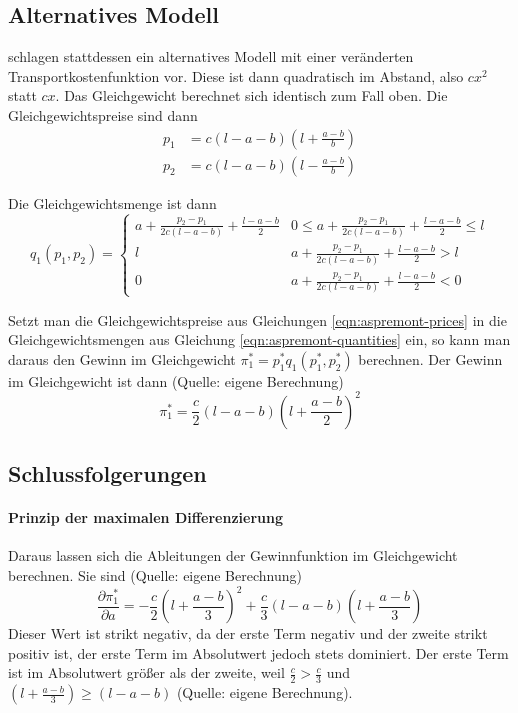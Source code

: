 \subsection{Alternatives Modell}\label{Sec-Aspremont-Modell}
\citet{aspremont1979} schlagen stattdessen ein alternatives Modell mit einer veränderten Transportkostenfunktion vor. Diese ist dann quadratisch im Abstand, also $cx^2$ statt $cx$.
Das Gleichgewicht berechnet sich identisch zum Fall oben. Die Gleichgewichtspreise sind dann
\begin{equation} \label{eqn:aspremont-prices}
\begin{split}
p_1 &= c (l-a-b) \left(l+\frac{a-b}{b}\right) \\
p_2 &= c (l-a-b) \left(l-\frac{a-b}{b}\right)
\end{split}
\end{equation}

Die Gleichgewichtsmenge ist dann \citep[S.\,1148]{aspremont1979}
\begin{equation} \label{eqn:aspremont-quantities}
q_1(p_1,p_2) = \begin{cases}
	a+ \frac{p_2-p_1}{2c(l-a-b)} + \frac{l-a-b}{2} & 0\leq a+ \frac{p_2-p_1}{2c(l-a-b)} + \frac{l-a-b}{2} \leq l\\
	l & a+ \frac{p_2-p_1}{2c(l-a-b)} + \frac{l-a-b}{2}>l\\
	0 & a+ \frac{p_2-p_1}{2c(l-a-b)} + \frac{l-a-b}{2}<0
\end{cases}
\end{equation}

Setzt man die Gleichgewichtspreise aus Gleichungen \ref{eqn:aspremont-prices} in die Gleichgewichtsmengen aus Gleichung \ref{eqn:aspremont-quantities} ein, so kann man daraus den Gewinn im Gleichgewicht $\pi_1^*=p_1^* q_1(p_1^*, p_2^*)$ berechnen.
Der Gewinn im Gleichgewicht ist dann (Quelle: eigene Berechnung)
\begin{equation}
\pi_1^* = \frac{c}{2} (l-a-b) \left(l+ \frac{a-b}{2} \right)^2
\end{equation}

\subsection{Schlussfolgerungen}

\paragraph{Prinzip der maximalen Differenzierung}
Daraus lassen sich die Ableitungen der Gewinnfunktion im Gleichgewicht berechnen. Sie sind (Quelle: eigene Berechnung)
\begin{equation}
\frac{\partial \pi_1^*}{\partial a} = -\frac{c}{2}\left(l+\frac{a-b}{3}\right)^2 + \frac{c}{3} (l-a-b) \left( l+\frac{a-b}{3} \right)
\end{equation}
Dieser Wert ist strikt negativ, da der erste Term negativ und der zweite strikt positiv ist, der erste Term im Absolutwert jedoch stets dominiert. Der erste Term ist im Absolutwert größer als der zweite, weil $\frac{c}{2} > \frac{c}{3}$ und $\left(l+\frac{a-b}{3}\right) \geq (l-a-b)$ (Quelle: eigene Berechnung).

